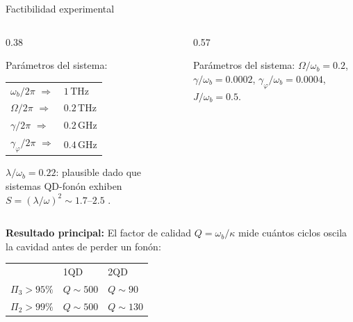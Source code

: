 \documentclass[
11pt,notheorems,hyperref={pdfauthor=whatever}
]{beamer}
\begin{document}
\begin{frame}{Factibilidad experimental}
	
	\begin{columns}[T]
		
		\begin{column}{0.38\textwidth}
			\vspace{4pt}
			{\small
				Parámetros del sistema:\\[8pt]
				\begin{tabular}{ll}
					$\omega_b/2\pi$ $\Rightarrow$ & $1\,\mathrm{THz}$ \\[3pt]
					$\Omega/2\pi$   $\Rightarrow$ & $0.2\,\mathrm{THz}$ \\[3pt]
					$\gamma/2\pi$   $\Rightarrow$ & $0.2\,\mathrm{GHz}$ \\[3pt]
					$\gamma_\varphi/2\pi$ $\Rightarrow$ & $0.4\,\mathrm{GHz}$
				\end{tabular}
				
				\vspace{8pt}
				$\lambda/\omega_b = 0.22$: plausible dado que
				sistemas QD-fonón exhiben $S = (\lambda/\omega)^2
				\sim 1.7$--$2.5$ \cite{weig2004}.
			}
		\end{column}
		
		\begin{column}{0.57\textwidth}
			\vspace{-4pt}
			\begin{center}
				\resizebox{\textwidth}{!}{%
				}
			\end{center}
			{\scriptsize
				Parámetros del sistema: $\Omega/\omega_b=0.2$, $\gamma/\omega_b=0.0002$,
				$\gamma_\varphi/\omega_b=0.0004$, $J/\omega_b=0.5$.
			}
		\end{column}
		
	\end{columns}
	
	\vspace{20pt}
	
	\textbf{Resultado principal:} El factor de calidad $Q = \omega_b/\kappa$
	mide cuántos ciclos oscila la cavidad antes de perder un fonón:\\[4pt]
	{\small
		\begin{center}
			\begin{tabular}{lll}
				& 1QD \cite{bin2020} & 2QD \\[3pt]
				$\Pi_3 > 95\%$ & $Q \sim 500$ & $Q \sim 90$ \\[3pt]
				$\Pi_2 > 99\%$ & $Q \sim 500$ & $Q \sim 130$
			\end{tabular}
		\end{center}
	}
	
\end{frame}
\end{document}
